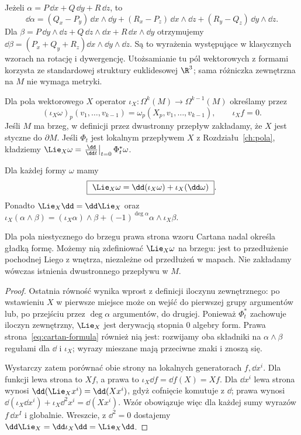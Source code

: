 \begin{przyklad}[Rachunek na $\R^3$]
Jeżeli $\alpha=P\,\dd x+Q\,\dd y+R\,\dd z$, to
\[
 \dd\alpha=(Q_x-P_y)\,\dd x\wedge\dd y
 +(R_x-P_z)\,\dd x\wedge\dd z
 +(R_y-Q_z)\,\dd y\wedge\dd z.
\]
Dla $\beta=P\,\dd y\wedge\dd z
+Q\,\dd z\wedge\dd x+R\,\dd x\wedge\dd y$
otrzymujemy $\dd\beta=(P_x+Q_y+R_z)
\dd x\wedge\dd y\wedge\dd z$.
Są to wyrażenia występujące w klasycznych wzorach na rotację
i dywergencję. Utożsamianie tu pól wektorowych z formami
korzysta ze standardowej struktury euklidesowej $\R^3$;
sama różniczka zewnętrzna na $M$ nie wymaga metryki.
\end{przyklad}

\begin{definicja}
\label{def:formy-kontrakcja-lie}
Dla pola wektorowego $X$ operator
$\iota_X:\Omega^k(M)\to\Omega^{k-1}(M)$ określamy przez
\[
 (\iota_X\omega)_p(v_1,\ldots,v_{k-1})
 =\omega_p(X_p,v_1,\ldots,v_{k-1}),
 \qquad \iota_Xf=0.
\]
Jeśli $M$ ma brzeg, w definicji przez dwustronny przepływ
zakładamy, że $X$ jest styczne do $\partial M$.
Jeśli $\Phi_t$ jest lokalnym przepływem $X$ z
Rozdziału~\ref{ch:pola}, kładziemy
$\Lie_X\omega=\left.\frac{\dd}{\dd t}\right|_{t=0}\Phi_t^*\omega$.
\end{definicja}

\begin{twierdzenie}
\label{thm:cartan-formy}
Dla każdej formy $\omega$ mamy
\begin{equation}\label{eq:cartan-formula}
 \boxed{\ \Lie_X\omega=\dd(\iota_X\omega)
       +\iota_X(\dd\omega)\ }.
\end{equation}
Ponadto $\Lie_X\dd=\dd\Lie_X$ oraz
$\iota_X(\alpha\wedge\beta)=
(\iota_X\alpha)\wedge\beta
+(-1)^{\deg\alpha}\alpha\wedge\iota_X\beta$.
\end{twierdzenie}
Dla pola niestycznego do brzegu prawa strona wzoru Cartana
nadal określa gładką formę. Możemy nią zdefiniować
$\Lie_X\omega$ na brzegu: jest to przedłużenie pochodnej
Liego z wnętrza, niezależne od przedłużeń w mapach.
Nie zakładamy wówczas istnienia dwustronnego przepływu w $M$.
\begin{proof}
Ostatnia równość wynika wprost z definicji iloczynu
zewnętrznego: po wstawieniu $X$ w pierwsze miejsce
może on wejść do pierwszej grupy argumentów lub,
po przejściu przez $\deg\alpha$ argumentów, do drugiej.
Ponieważ $\Phi_t^*$ zachowuje iloczyn zewnętrzny,
$\Lie_X$ jest derywacją stopnia $0$ algebry form.
Prawa strona~\eqref{eq:cartan-formula} również nią jest:
rozwijamy oba składniki na $\alpha\wedge\beta$
regułami dla $\dd$ i $\iota_X$; wyrazy mieszane mają
przeciwne znaki i znoszą się.

Wystarczy zatem porównać obie strony na lokalnych
generatorach $f,\dd x^i$. Dla funkcji lewa strona to
$Xf$, a prawa to $\iota_X\dd f=\dd f(X)=Xf$.
Dla $\dd x^i$ lewa strona wynosi
$\dd(\Lie_Xx^i)=\dd(Xx^i)$, gdyż cofnięcie
komutuje z $\dd$; prawa wynosi
$\dd(\iota_X\dd x^i)+\iota_X\dd^2x^i
=\dd(Xx^i)$. Wzór obowiązuje więc dla
każdej sumy wyrazów $f\,\dd x^I$ i globalnie.
Wreszcie, z $\dd^2=0$ dostajemy
$\dd\Lie_X=\dd\iota_X\dd
=\Lie_X\dd$.
\end{proof}

